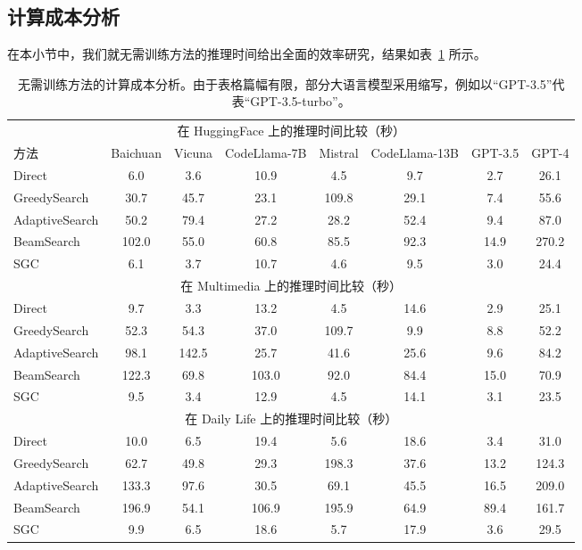 \documentclass[11pt,UTF8,fontset=fandol]{ctexart}
\begin{document}
\subsection{计算成本分析}

在本小节中，我们就无需训练方法的推理时间给出全面的效率研究，结果如表~\ref{tab:10} 所示。

\begin{table}[H]\centering
\caption{无需训练方法的计算成本分析。由于表格篇幅有限，部分大语言模型采用缩写，例如以“GPT-3.5”代表“GPT-3.5-turbo”。}
\label{tab:10}
\small
\setlength{\tabcolsep}{4pt}
\begin{tabular}{lccccccc}
\toprule
\multicolumn{8}{c}{在 HuggingFace 上的推理时间比较（秒）}\\
方法 & Baichuan & Vicuna & CodeLlama-7B & Mistral & CodeLlama-13B & GPT-3.5 & GPT-4\\
\midrule
Direct & 6.0 & 3.6 & 10.9 & 4.5 & 9.7 & 2.7 & 26.1\\
GreedySearch & 30.7 & 45.7 & 23.1 & 109.8 & 29.1 & 7.4 & 55.6\\
AdaptiveSearch & 50.2 & 79.4 & 27.2 & 28.2 & 52.4 & 9.4 & 87.0\\
BeamSearch & 102.0 & 55.0 & 60.8 & 85.5 & 92.3 & 14.9 & 270.2\\
SGC & 6.1 & 3.7 & 10.7 & 4.6 & 9.5 & 3.0 & 24.4\\
\midrule
\multicolumn{8}{c}{在 Multimedia 上的推理时间比较（秒）}\\
\midrule
Direct & 9.7 & 3.3 & 13.2 & 4.5 & 14.6 & 2.9 & 25.1\\
GreedySearch & 52.3 & 54.3 & 37.0 & 109.7 & 9.9 & 8.8 & 52.2\\
AdaptiveSearch & 98.1 & 142.5 & 25.7 & 41.6 & 25.6 & 9.6 & 84.2\\
BeamSearch & 122.3 & 69.8 & 103.0 & 92.0 & 84.4 & 15.0 & 70.9\\
SGC & 9.5 & 3.4 & 12.9 & 4.5 & 14.1 & 3.1 & 23.5\\
\midrule
\multicolumn{8}{c}{在 Daily Life 上的推理时间比较（秒）}\\
\midrule
Direct & 10.0 & 6.5 & 19.4 & 5.6 & 18.6 & 3.4 & 31.0\\
GreedySearch & 62.7 & 49.8 & 29.3 & 198.3 & 37.6 & 13.2 & 124.3\\
AdaptiveSearch & 133.3 & 97.6 & 30.5 & 69.1 & 45.5 & 16.5 & 209.0\\
BeamSearch & 196.9 & 54.1 & 106.9 & 195.9 & 64.9 & 89.4 & 161.7\\
SGC & 9.9 & 6.5 & 18.6 & 5.7 & 17.9 & 3.6 & 29.5\\
\bottomrule
\end{tabular}
\end{table}
\end{document}
